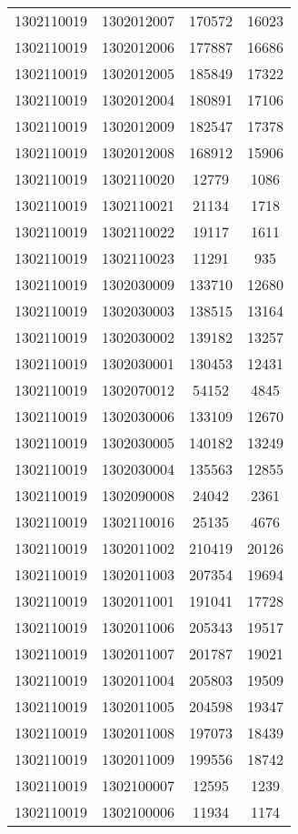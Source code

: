 \begin{longtable}[h]{llcc}
		1302110019 & 1302012007 & 170572 & 16023\\
		1302110019 & 1302012006 & 177887 & 16686\\
		1302110019 & 1302012005 & 185849 & 17322\\
		1302110019 & 1302012004 & 180891 & 17106\\
		1302110019 & 1302012009 & 182547 & 17378\\
		1302110019 & 1302012008 & 168912 & 15906\\
		1302110019 & 1302110020 & 12779 & 1086\\
		1302110019 & 1302110021 & 21134 & 1718\\
		1302110019 & 1302110022 & 19117 & 1611\\
		1302110019 & 1302110023 & 11291 & 935\\
		1302110019 & 1302030009 & 133710 & 12680\\
		1302110019 & 1302030003 & 138515 & 13164\\
		1302110019 & 1302030002 & 139182 & 13257\\
		1302110019 & 1302030001 & 130453 & 12431\\
		1302110019 & 1302070012 & 54152 & 4845\\
		1302110019 & 1302030006 & 133109 & 12670\\
		1302110019 & 1302030005 & 140182 & 13249\\
		1302110019 & 1302030004 & 135563 & 12855\\
		1302110019 & 1302090008 & 24042 & 2361\\
		1302110019 & 1302110016 & 25135 & 4676\\
		1302110019 & 1302011002 & 210419 & 20126\\
		1302110019 & 1302011003 & 207354 & 19694\\
		1302110019 & 1302011001 & 191041 & 17728\\
		1302110019 & 1302011006 & 205343 & 19517\\
		1302110019 & 1302011007 & 201787 & 19021\\
		1302110019 & 1302011004 & 205803 & 19509\\
		1302110019 & 1302011005 & 204598 & 19347\\
		1302110019 & 1302011008 & 197073 & 18439\\
		1302110019 & 1302011009 & 199556 & 18742\\
		1302110019 & 1302100007 & 12595 & 1239\\
		1302110019 & 1302100006 & 11934 & 1174\\

\end{longtable}
